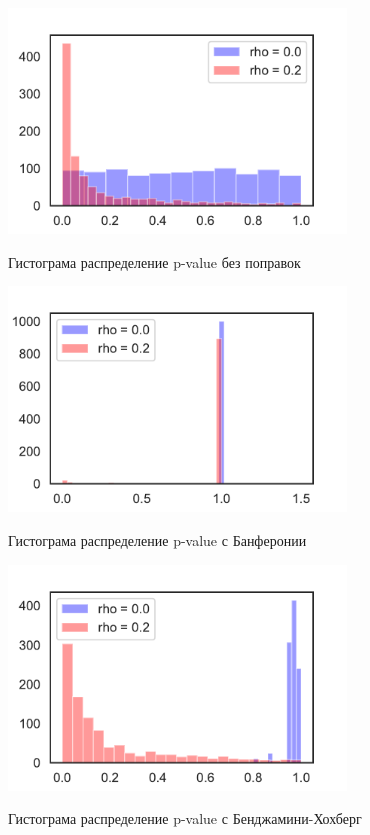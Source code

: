 \documentclass[12pt, twoside]{article}
\begin{document}
\begin{figure}[h!]\center
{\includegraphics[width=0.8\textwidth]{sampler_task6_p2}}
\caption{Гистограма распределение p-value без поправок}
\label{sampler_task6_p2}
\end{figure}

\begin{figure}[h!]\center
{\includegraphics[width=0.8\textwidth]{sampler_task6_p3}}
\caption{Гистограма распределение p-value с Банферонии}
\label{sampler_task6_p3}
\end{figure}

\begin{figure}[h!]\center
{\includegraphics[width=0.8\textwidth]{sampler_task6_p4}}
\caption{Гистограма распределение p-value с Бенджамини-Хохберг}
\label{sampler_task6_p4}
\end{figure}
\end{document}
